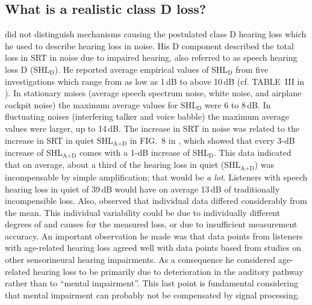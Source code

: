\documentclass[10pt,a4paper,twocolumn]{article}
\begin{document}
\subsection*{What is a realistic class D loss?}
%
\cite{plomp1978} did not distinguish mechanisms causing the postulated class D hearing loss which he used to describe hearing loss in noise.
%
His D component described the total loss in SRT in noise due to impaired hearing, also referred to as speech hearing loss D (SHL$_\text{D}$).
%
He reported average empirical values of SHL$_\text{D}$ from five investigations which range from as low as 1\,dB to above 10\,dB (cf. TABLE~III in \cite{plomp1978}).
%
In stationary noises (average speech spectrum noise, white noise, and airplane cockpit noise) the maximum average values for SHL$_\text{D}$ were 6 to 8\,dB.
%
In fluctuating noises (interfering talker and voice babble) the maximum average values were larger, up to 14\,dB.
%
The increase in SRT in noise was related to the increase in SRT in quiet SHL$_\text{A+D}$ in FIG.~8 in \cite{plomp1978}, which showed that every 3-dB increase of SHL$_\text{A+D}$ comes with a 1-dB increase of SHL$_\text{D}$.
%
This data indicated that on average, about a third of the hearing loss in quiet (SHL$_\text{A+D}$) was incompensable by simple amplification; that would be \emph{a lot}.
%
Listeners with speech hearing loss in quiet of 39\,dB would have on average 13\,dB of traditionally incompensible loss.
%
Also, \cite{plomp1978} observed that individual data differed considerably from the mean.
%
This individual variability could be due to individually different degrees of and causes for the measured loss, or due to insufficient measurement accuracy.
%
An important observation he made was that data points from listeners with age-related hearing loss agreed well with data points based from studies on other sensorineural hearing impairments.
%
As a consequence he considered age-related hearing loss to be primarily due to deterioration in the auditory pathway rather than to \enquote{mental impairment}.
%
This last point is fundamental considering that mental impairment can probably not be compensated by signal processing.
\end{document}
